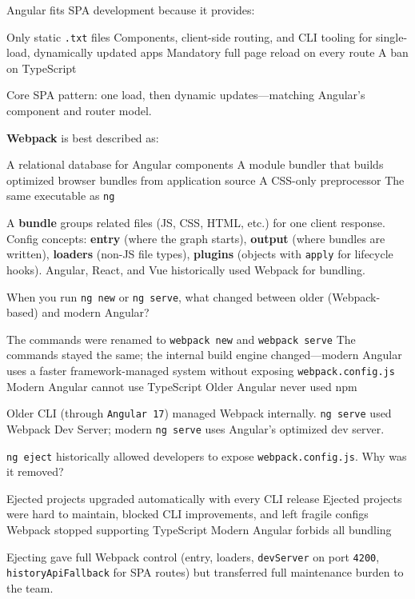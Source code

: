 \question[4]
Angular fits SPA development because it provides:
\begin{choices}
  \choice Only static \texttt{.txt} files
  \CorrectChoice Components, client-side routing, and CLI tooling for single-load, dynamically updated apps
  \choice Mandatory full page reload on every route
  \choice A ban on TypeScript
\end{choices}
\begin{solution}
  Core SPA pattern: one load, then dynamic updates---matching Angular's component and router model.
\end{solution}

\question[4]
\textbf{Webpack} is best described as:
\begin{choices}
  \choice A relational database for Angular components
  \CorrectChoice A module bundler that builds optimized browser bundles from application source
  \choice A CSS-only preprocessor
  \choice The same executable as \texttt{ng}
\end{choices}
\begin{solution}
  A \textbf{bundle} groups related files (JS, CSS, HTML, etc.) for one client response. Config concepts: \textbf{entry} (where the graph starts), \textbf{output} (where bundles are written), \textbf{loaders} (non-JS file types), \textbf{plugins} (objects with \texttt{apply} for lifecycle hooks). Angular, React, and Vue historically used Webpack for bundling.
\end{solution}

\question[4]
When you run \texttt{ng new} or \texttt{ng serve}, what changed between older (Webpack-based) and modern Angular?
\begin{choices}
  \choice The commands were renamed to \texttt{webpack new} and \texttt{webpack serve}
  \CorrectChoice The commands stayed the same; the internal build engine changed---modern Angular uses a faster framework-managed system without exposing \texttt{webpack.config.js}
  \choice Modern Angular cannot use TypeScript
  \choice Older Angular never used npm
\end{choices}
\begin{solution}
  Older CLI (through \texttt{Angular~17}) managed Webpack internally. \texttt{ng serve} used Webpack Dev Server; modern \texttt{ng serve} uses Angular's optimized dev server.
\end{solution}

\question[4]
\texttt{ng eject} historically allowed developers to expose \texttt{webpack.config.js}. Why was it removed?
\begin{choices}
  \choice Ejected projects upgraded automatically with every CLI release
  \CorrectChoice Ejected projects were hard to maintain, blocked CLI improvements, and left fragile configs
  \choice Webpack stopped supporting TypeScript
  \choice Modern Angular forbids all bundling
\end{choices}
\begin{solution}
  Ejecting gave full Webpack control (entry, loaders, \texttt{devServer} on port \texttt{4200}, \texttt{historyApiFallback} for SPA routes) but transferred full maintenance burden to the team.
\end{solution}

